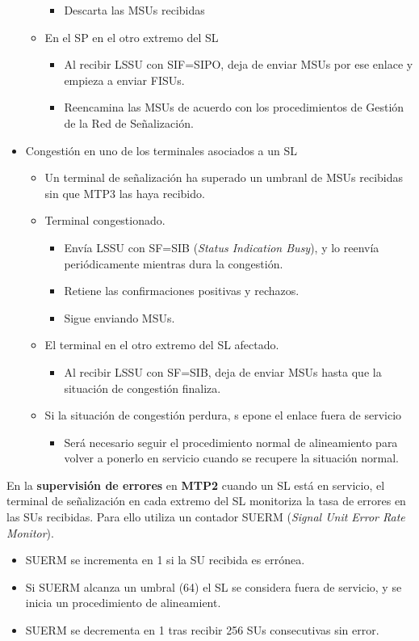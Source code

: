 \documentclass[10pt,portrait, twocolumn]{article}
\begin{document}
\begin{itemize}
\begin{itemize}
\begin{itemize}
			\item Descarta las MSUs recibidas
			\end{itemize}
		\item En el SP en el otro extremo del SL
			\begin{itemize}
			\item Al recibir LSSU con SIF=SIPO, deja de enviar MSUs por ese enlace y empieza a enviar FISUs.
			\item Reencamina las MSUs de acuerdo con los procedimientos de Gestión de la Red de Señalización.
			\end{itemize}
		\end{itemize}
	\item Congestión en uno de los terminales asociados a un SL
		\begin{itemize}
		\item Un terminal de señalización ha superado un umbranl de MSUs recibidas sin que MTP3 las haya recibido.
		\item Terminal congestionado.
			\begin{itemize}
			\item Envía LSSU con SF=SIB (\textit{Status Indication Busy}), y lo reenvía periódicamente mientras dura la congestión.
			\item Retiene las confirmaciones positivas y rechazos.
			\item Sigue enviando MSUs.
			\end{itemize}
		\item El terminal en el otro extremo del SL afectado.
			\begin{itemize}
			\item Al recibir LSSU con SF=SIB, deja de enviar MSUs hasta que la situación de congestión finaliza.
			\end{itemize}
		\item Si la situación de congestión perdura, s epone el enlace fuera de servicio
			\begin{itemize}
			\item Será necesario seguir el procedimiento normal de alineamiento para volver a ponerlo en servicio cuando se recupere la situación normal.
			\end{itemize}
		\end{itemize}
	\end{itemize}	
	
	
En la \textbf{supervisión de errores} en \textbf{MTP2} cuando un SL está en servicio, el terminal de señalización en cada extremo del SL monitoriza la tasa de errores en las SUs recibidas. Para ello utiliza un contador SUERM (\textit{Signal Unit Error Rate Monitor}).
	\begin{itemize}
	\item SUERM se incrementa en 1 si la SU recibida es errónea.
	\item Si SUERM alcanza un umbral (64) el SL se considera fuera de servicio, y se inicia un procedimiento de alineamient.
	\item SUERM se decrementa en 1 tras recibir 256 SUs consecutivas sin error.
	\end{itemize}	
	
\end{document}
